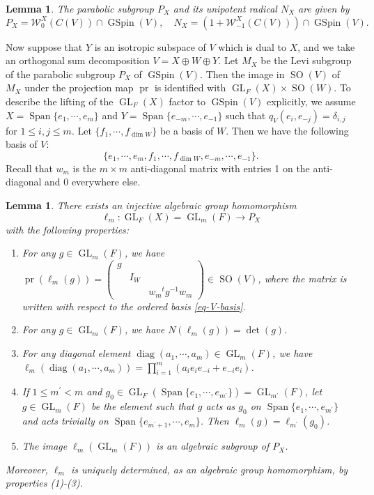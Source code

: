 \documentclass[12pt]{amsart}
\newcommand{\Span}{\operatorname{Span}}
\newtheorem{lemma}[theorem]{Lemma}
\theoremstyle{remark}
\newcommand{\pr}{\operatorname{pr}}
\DeclareMathOperator{\diag}{diag}
\DeclareMathOperator{\GL}{GL}
\DeclareMathOperator{\SO}{SO}
\DeclareMathOperator{\GSpin}{GSpin}
\begin{document}
\begin{lemma}
\cite[Lemma 2.3]{Pollack2018}
The parabolic subgroup $P_X$ and its unipotent radical $N_X$ are given by
\begin{equation*}
P_X = 	\mathcal{W}_{0}^{X}(C(V))\cap \GSpin(V), \quad N_X=(1+ \mathcal{W}_{-1}^{X}(C(V))) \cap \GSpin(V).
\end{equation*}
\label{lemma-parabolic-via-Clifford}
\end{lemma}
 
 
Now suppose that $Y$ is an isotropic subspace of $V$ which is dual to $X$, and we take an orthogonal sum decomposition $V=X\oplus W\oplus Y$. 
Let $M_X$ be the Levi subgroup of the parabolic subgroup $P_X$ of $\GSpin(V)$. 
Then the image in $\SO(V)$ of $M_X$ under the projection map $\pr$ is identified with $\GL_F(X)\times \SO(W)$. 
To describe the lifting of the $\GL_F(X)$ factor to $\GSpin(V)$ explicitly, we assume  $X=\Span\{e_1, \cdots, e_m\}$ and $Y=\Span\{e_{-m}, \cdots, e_{-1}\}$ such that $q_V( e_i, e_{-j})=\delta_{i,j}$ for $1\le i, j\le m$. Let $\{f_1, \cdots,f_{\dim W}\}$ be a basis of $W$. Then we have the following basis of $V$:
\begin{equation}
\label{eq-V-basis}
	\{e_1, \cdots, e_m, f_1, \cdots, f_{\dim W}, e_{-m}, \cdots, e_{-1}\}.
\end{equation}
Recall that $w_m$ is the $m\times m$ anti-diagonal matrix with entries 1 on the anti-diagonal and 0 everywhere else. 
\begin{lemma}
\cite[Proposition 4.8]{Shimura2004}
\label{lemma-Levi-lifting}
There exists an injective algebraic group homomorphism 
\begin{equation*}
	\ell_m:\GL_F(X)=\GL_m(F)\to P_X
\end{equation*}
with the following properties:
\begin{enumerate}
\item For any $g\in \GL_m(F)$, we have $\pr(\ell_m(g))=\begin{pmatrix} g & & \\ &I_W &\\ & & w_m {}^tg^{-1} w_m \end{pmatrix}\in \SO(V)$, where the matrix is written with respect to the ordered basis \eqref{eq-V-basis}.
\item For any $g\in \GL_m(F)$, we have $N(\ell_m(g))=\det(g)$. 
\item For any diagonal element $\diag(a_1, \cdots, a_m)\in \GL_m(F)$, we have $\ell_m(\diag(a_1, \cdots, a_m))=\prod_{i=1}^m (a_i e_ie_{-i}+e_{-i} e_i)$. 
\item If $1\le m^\prime <m$ and $g_0\in \GL_F(\Span\{e_1, \cdots, e_{m^\prime} \} )=\GL_{m^\prime}(F)$, let $g\in \GL_m(F)$ be the element such that $g$ acts as $g_0$ on $\Span\{e_1, \cdots, e_{m^\prime} \}$ and acts trivially on $\Span\{e_{m^\prime+1}, \cdots, e_{m} \}$. Then $\ell_m(g)=\ell_{m^\prime}(g_0)$.
\item The image $\ell_m(\GL_m(F))$ is an algebraic subgroup of $P_X$.
\end{enumerate}
Moreover, $\ell_m$ is uniquely determined, as an algebraic group homomorphism, by properties (1)-(3).
\end{lemma}
\end{document}
